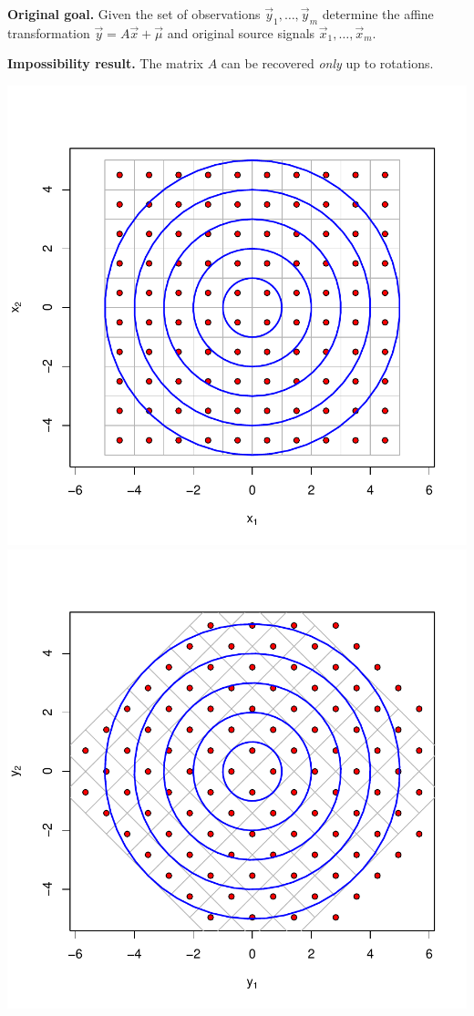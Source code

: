 \documentclass[landscape,footrule]{foils}
\begin{document}

\textbf{Original goal.} 
Given the set of observations $\vec{y}_1,\ldots, \vec{y}_m$ determine the affine transformation $\vec{y}=A\vec{x}+\vec{\mu}$ and original source signals  $\vec{x}_1,\ldots, \vec{x}_m$.


\textbf{Impossibility result.}
The matrix $A$ can be recovered \emph{only} up to rotations.


\begin{center}
\includegraphics[scale=0.55]{original-contours.pdf}
\includegraphics[scale=0.55]{rotated-contours.pdf}
\end{center}\vspace*{-1cm}
\end{document}
